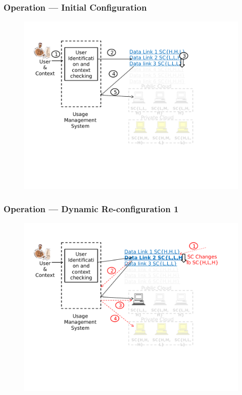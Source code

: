 \documentclass[t,handout]{beamer}
\begin{document}
\begin{frame}
\frametitle{Operation --- Initial Configuration}
\begin{figure}[!t]
\centering
\includegraphics[width=\textwidth]{3}
\end{figure}
\end{frame}

\begin{frame}
\frametitle{Operation --- Dynamic Re-configuration 1}
\begin{figure}[!t]
\centering
\includegraphics[width=\textwidth]{4}
\end{figure}
\end{frame}
\end{document}
